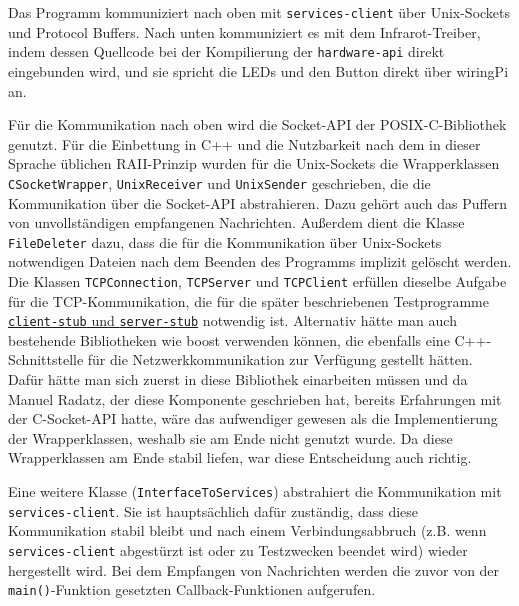 Das Programm kommuniziert nach oben mit \texttt{services-client} über Unix-Sockets und Protocol
Buffers.
Nach unten kommuniziert es mit dem Infrarot-Treiber, indem dessen Quellcode bei der Kompilierung
der \texttt{hardware-api} direkt eingebunden wird, und sie spricht die LEDs und den Button direkt
über wiringPi an.

Für die Kommunikation nach oben wird die Socket-API der POSIX-C-Bibliothek genutzt.
Für die Einbettung in C++ und die Nutzbarkeit nach dem in dieser Sprache üblichen RAII-Prinzip
wurden für die Unix-Sockets die Wrapperklassen \texttt{CSocketWrapper}, \texttt{UnixReceiver} und
\texttt{UnixSender} geschrieben, die die Kommunikation über die Socket-API abstrahieren.
Dazu gehört auch das Puffern von unvollständigen empfangenen Nachrichten.
Außerdem dient die Klasse \texttt{FileDeleter} dazu, dass die für die Kommunikation über
Unix-Sockets notwendigen Dateien nach dem Beenden des Programms implizit gelöscht werden.
Die Klassen \texttt{TCPConnection}, \texttt{TCPServer} und \texttt{TCPClient} erfüllen dieselbe
Aufgabe für die TCP-Kommunikation, die für die später beschriebenen Testprogramme
\hyperref[client-stub-und-server-stub]{\texttt{client-stub} und \texttt{server-stub}} notwendig ist.
Alternativ hätte man auch bestehende Bibliotheken wie boost verwenden können, die ebenfalls eine
C++-Schnittstelle für die Netzwerkkommunikation zur Verfügung gestellt hätten.
Dafür hätte man sich zuerst in diese Bibliothek einarbeiten müssen und da Manuel Radatz, der diese
Komponente geschrieben hat, bereits Erfahrungen mit der C-Socket-API hatte, wäre das aufwendiger
gewesen als die Implementierung der Wrapperklassen, weshalb sie am Ende nicht genutzt wurde.
Da diese Wrapperklassen am Ende stabil liefen, war diese Entscheidung auch richtig.

Eine weitere Klasse (\texttt{InterfaceToServices}) abstrahiert die Kommunikation mit
\texttt{services-client}.
Sie ist hauptsächlich dafür zuständig, dass diese Kommunikation stabil bleibt und nach einem
Verbindungsabbruch (z.B. wenn \texttt{services-client} abgestürzt ist oder zu Testzwecken beendet
wird) wieder hergestellt wird.
Bei dem Empfangen von Nachrichten werden die zuvor von der \texttt{main()}-Funktion gesetzten
Callback-Funktionen aufgerufen.

